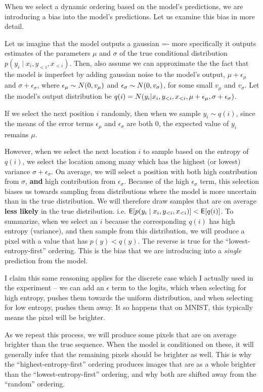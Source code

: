 When we select a dynamic ordering based on the model's predictions, we are introducing a bias into the model's predictions. Let us examine this bias in more detail.

Let us imagine that the model outputs a gaussian =- more specifically it outputs estimates of the parameters $\mu$ and $\sigma$ of the true conditional distribution $p(y_i \mid x_i, y_{<i}, x_{<i})$. Then, also assume we can approximate the the fact that the model is imperfect by adding gaussian noise to the model's output, $\mu + \epsilon_\mu$ and $\sigma + \epsilon_\sigma$, where $\epsilon_\mu \sim \relax{N}(0, v_\mu)$ and $\epsilon_\sigma \sim \relax{N}(0, v_\sigma)$, for some small $v_\mu$ and $v_\sigma$. Let the model's output distribution be $q(i) = \relax{N}(y_i | x_i, y_{<i}, x_{<i}, \mu + \epsilon_\mu, \sigma + \epsilon_\sigma)$.

If we select the next position $i$ randomly, then when we sample $y_i \sim q(i)$, since the means of the error terms $\epsilon_\mu$ and $\epsilon_\sigma$ are both 0, the expected value of $y_i$ remains $\mu$.

However, when we select the next location $i$ to sample based on the entropy of $q(i)$, we select the location among many which has the highest (or lowest) variance $\sigma + \epsilon_\sigma$. On average, we will select a position with both high contribution from $\sigma$, \textbf{and} high contribution  from $\epsilon_\sigma$. Because of the high $\epsilon_\sigma$ term, this selection biases us towards sampling from distributions where the model is more uncertain than in the true distribution. We will therefore draw samples that are on average \textbf{less likely} in the true distribution. i.e. $\mathsf{E}[p(y_i \mid x_i, y_{<i}, x_{<i})] < \mathsf{E}[q(i)]$. To summarize, when we select an $i$ because the corresponding $q(i)$ has high entropy (variance), and then sample from this distribution, we will produce a pixel with a value that has $p(y) < q(y)$. The reverse is true for the ``lowest-entropy-first'' ordering. This is the bias that we are introducing into a \textit{single} prediction from the model.

I claim this same reasoning applies for the discrete case which I actually used in the experiment -- we can add an $\epsilon$ term to the logits, which when selecting for high entropy, pushes them towards the uniform distribution, and when selecting for low entropy, pushes them away. It so happens that on MNIST, this typically means the pixel will be brighter.

As we repeat this process, we will produce some pixels that are on average brighter than the true sequence. When the model is conditioned on these, it will generally infer that the remaining pixels should be brighter as well. This is why the ``highest-entropy-first'' ordering produces images that are as a whole brighter than the ``lowest-entropy-first'' ordering, and why both are shifted away from the ``random'' ordering.


